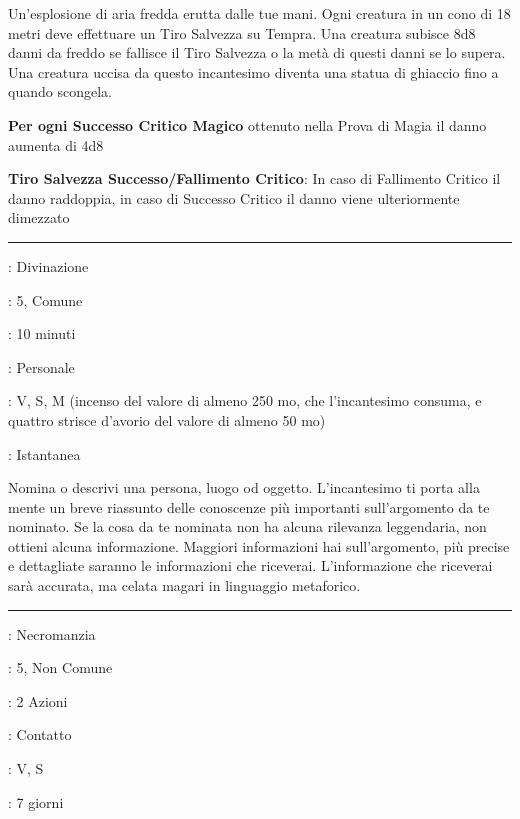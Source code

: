 \begin{multicols}{2}
Un'esplosione di aria fredda erutta dalle tue mani. Ogni creatura in un cono di 18 metri deve effettuare un Tiro Salvezza su Tempra. Una creatura subisce 8d8 danni da freddo se fallisce il Tiro Salvezza o la metà di questi danni se lo supera. Una creatura uccisa da questo incantesimo diventa una statua di ghiaccio fino a quando scongela.

\textbf{Per ogni Successo Critico Magico} ottenuto nella Prova di Magia il danno aumenta di 4d8

\textbf{Tiro Salvezza Successo/Fallimento Critico}: In caso di Fallimento Critico il danno raddoppia, in caso di Successo Critico il danno viene ulteriormente dimezzato

\smallskip\noindent\rule{\linewidth}{2pt} \hypertarget{Conoscenza delle Leggende}{}\smallskip{}
\noindent
\begin{description}[noitemsep, topsep=0pt, parsep=0pt, partopsep=0pt, leftmargin=0cm, labelwidth=2.8cm]
	\item[\textbf{Lista di Magia}]: Divinazione
	\item[\textbf{Livello}]: 5, Comune
	\item[\textbf{T. di Lancio}]: 10 minuti
	\item[\textbf{Gittata}]: Personale
	\item[\textbf{Componenti}]: V, S, M (incenso del valore di almeno 250 mo, che l'incantesimo consuma, e quattro strisce d'avorio del valore di almeno 50 mo)
	\item[\textbf{Durata}]: Istantanea
\end{description}

Nomina o descrivi una persona, luogo od oggetto. L'incantesimo ti porta alla mente un breve riassunto delle conoscenze più importanti sull'argomento da te nominato. Se la cosa da te nominata non ha alcuna rilevanza leggendaria, non ottieni alcuna informazione. Maggiori informazioni hai sull'argomento, più precise e dettagliate saranno le informazioni che riceverai. L'informazione che riceverai sarà accurata, ma celata magari in linguaggio metaforico.

\smallskip\noindent\rule{\linewidth}{2pt} \hypertarget{Contagio}{}\smallskip{}
\noindent
\begin{description}[noitemsep, topsep=0pt, parsep=0pt, partopsep=0pt, leftmargin=0cm, labelwidth=2.8cm]
	\item[\textbf{Lista di Magia}]: Necromanzia
	\item[\textbf{Livello}]: 5, Non Comune
	\item[\textbf{T. di Lancio}]: 2 Azioni
	\item[\textbf{Gittata}]: Contatto
	\item[\textbf{Componenti}]: V, S
	\item[\textbf{Durata}]: 7 giorni
\end{description}


\end{multicols}
